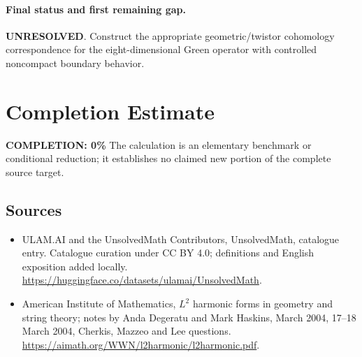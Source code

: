 \documentclass[11pt]{article}
\begin{document}
\paragraph{Final status and first remaining gap.}
\textbf{UNRESOLVED}. Construct the appropriate geometric/twistor cohomology correspondence for the eight-dimensional Green operator with controlled noncompact boundary behavior.

\section{Completion Estimate}
\noindent\textbf{COMPLETION: 0\%}
The calculation is an elementary benchmark or conditional reduction; it establishes no claimed new portion of the complete source target.

\subsection{Sources}
\begin{itemize}
\item[\hypertarget{source:statement:1}{S1}] ULAM.AI and the UnsolvedMath Contributors, UnsolvedMath, catalogue entry. Catalogue curation under CC BY 4.0; definitions and English exposition added locally.
\url{https://huggingface.co/datasets/ulamai/UnsolvedMath}.
\item[\hypertarget{source:statement:2}{S2}] American Institute of Mathematics, $L^2$ harmonic forms in geometry and string theory; notes by Anda Degeratu and Mark Haskins, March 2004, 17–18 March 2004, Cherkis, Mazzeo and Lee questions.
\url{https://aimath.org/WWN/l2harmonic/l2harmonic.pdf}.
\end{itemize}
\label{end:statement}
\end{document}
